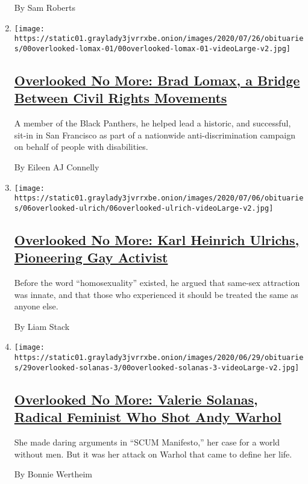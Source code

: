 \begin{enumerate}
  By Sam Roberts
\item
  \texttt{[image: https://static01.graylady3jvrrxbe.onion/images/2020/07/26/obituaries/00overlooked-lomax-01/00overlooked-lomax-01-videoLarge-v2.jpg]}

  \hypertarget{overlooked-no-more-brad-lomax-a-bridge-between-civil-rights-movements}{%
  \subsection{\texorpdfstring{\href{/2020/07/08/obituaries/brad-lomax-overlooked.html}{Overlooked
  No More: Brad Lomax, a Bridge Between Civil Rights
  Movements}}{Overlooked No More: Brad Lomax, a Bridge Between Civil Rights Movements}}\label{overlooked-no-more-brad-lomax-a-bridge-between-civil-rights-movements}}

  A member of the Black Panthers, he helped lead a historic, and
  successful, sit-in in San Francisco as part of a nationwide
  anti-discrimination campaign on behalf of people with disabilities.

  By Eileen AJ Connelly
\item
  \texttt{[image: https://static01.graylady3jvrrxbe.onion/images/2020/07/06/obituaries/06overlooked-ulrich/06overlooked-ulrich-videoLarge-v2.jpg]}

  \hypertarget{overlooked-no-more-karl-heinrich-ulrichs-pioneering-gay-activist}{%
  \subsection{\texorpdfstring{\href{/2020/07/01/obituaries/karl-heinrich-ulrichs-overlooked.html}{Overlooked
  No More: Karl Heinrich Ulrichs, Pioneering Gay
  Activist}}{Overlooked No More: Karl Heinrich Ulrichs, Pioneering Gay Activist}}\label{overlooked-no-more-karl-heinrich-ulrichs-pioneering-gay-activist}}

  Before the word ``homosexuality'' existed, he argued that same-sex
  attraction was innate, and that those who experienced it should be
  treated the same as anyone else.

  By Liam Stack
\item
  \texttt{[image: https://static01.graylady3jvrrxbe.onion/images/2020/06/29/obituaries/29overlooked-solanas-3/00overlooked-solanas-3-videoLarge-v2.jpg]}

  \hypertarget{overlooked-no-more-valerie-solanas-radical-feminist-who-shot-andy-warhol}{%
  \subsection{\texorpdfstring{\href{/2020/06/26/obituaries/valerie-solanas-overlooked.html}{Overlooked
  No More: Valerie Solanas, Radical Feminist Who Shot Andy
  Warhol}}{Overlooked No More: Valerie Solanas, Radical Feminist Who Shot Andy Warhol}}\label{overlooked-no-more-valerie-solanas-radical-feminist-who-shot-andy-warhol}}

  She made daring arguments in ``SCUM Manifesto,'' her case for a world
  without men. But it was her attack on Warhol that came to define her
  life.

  By Bonnie Wertheim
\end{enumerate}

